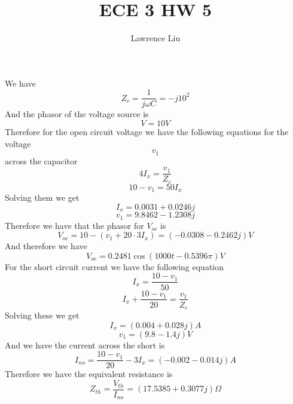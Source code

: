 \documentclass[12pt]{article}
\title{ECE 3 HW 5}
\author{Lawrence Liu}
\begin{document}
\maketitle
We have
$$Z_c=\frac{1}{j\omega C}=-j10^2$$
And the phasor of the voltage source is
$$V=10V$$
Therefore for the open circuit voltage we have the following equations for the voltage
$$v_1$$ across the capacitor
$$4I_x=\frac{v_1}{Z_c}$$
$$10-v_1=50I_x$$
Solving them we get
$$I_x=0.0031+0.0246j$$
$$v_1=9.8462-1.2308j$$
Therefore we have that the phasor for $V_{oc}$ is
$$V_{oc}=10-(v_1+20\cdot3I_x)=\boxed{(-0.0308-0.2462j) V}$$
And therefore we have
$$V_{oc}=\boxed{0.2481\cos(1000t-0.5396\pi)V}$$
For the short circuit current we have the following equation
$$I_x=\frac{10-v_1}{50}$$
$$I_x+\frac{10-v_1}{20}=\frac{v_1}{Z_c}$$
Solving these we get
$$I_x=(0.004+0.028j)A$$
$$v_1=(9.8-1.4j)V$$
And we have the current across the short is
$$I_{no}=\frac{10-v_1}{20}-3I_x=(-0.002-0.014j)A$$
Therefore we have the equivalent resistance is
$$Z_{th}=\frac{V_{th}}{I_{no}}=\boxed{(17.5385+0.3077j)\Omega}$$
\end{document}
